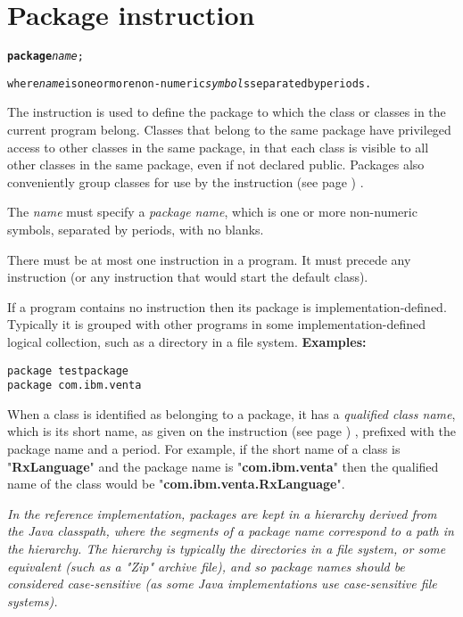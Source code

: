 \section{Package instruction}\label{refpackage}
\begin{shaded}
\begin{alltt}
\textbf{package} \emph{name};

where \emph{name} is one or more non-numeric \emph{symbol}s separated by periods.
\end{alltt}
\end{shaded}
 
The  instruction is used to define the package to which
the class or classes in the current program belong.
 Classes that belong to the same package have privileged access to
other classes in the same package, in that each class is visible to all
other classes in the same package, even if not declared public.
Packages also conveniently group classes for use by the
  instruction (see page \pageref{refimport}) .
 
The \emph{name} must specify a \emph{package name}, which is one
or more non-numeric symbols, separated by periods, with no
blanks.
 
There must be at most one  instruction in a program.
It must precede any  instruction (or any instruction that
would start the default class).
 
If a program contains no  instruction then its package
is implementation-defined.  Typically it is grouped with other programs
in some implementation-defined logical collection, such as a directory
in a file system.
 \textbf{Examples:}
\begin{lstlisting}
package testpackage
package com.ibm.venta
\end{lstlisting}
 
When a class is identified as belonging to a package, it has a
\emph{qualified class name}, which is its short name, as given on the
  instruction (see page \pageref{refclass}) , prefixed with the package
name and a period.
For example, if the short name of a class is
"\textbf{RxLanguage}" and the package name is
"\textbf{com.ibm.venta}" then the qualified name of the class
would be "\textbf{com.ibm.venta.RxLanguage}".
 
\emph{In the reference implementation, packages are kept in a hierarchy
derived from the Java classpath, where the segments of a package name
correspond to a path in the hierarchy.
The hierarchy is typically the directories in a file system, or some
equivalent (such as a "Zip" archive file), and so package names
should be considered case-sensitive (as some Java implementations use
case-sensitive file systems).
}
